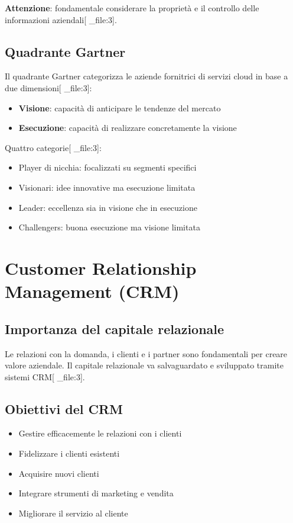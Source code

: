 \documentclass[12pt,a4paper]{article}
\begin{document}
\textbf{Attenzione}: fondamentale considerare la proprietà e il controllo delle informazioni aziendali[ _file:3].

\subsection{Quadrante Gartner}
Il quadrante Gartner categorizza le aziende fornitrici di servizi cloud in base a due dimensioni[ _file:3]:
\begin{itemize}
    \item \textbf{Visione}: capacità di anticipare le tendenze del mercato
    \item \textbf{Esecuzione}: capacità di realizzare concretamente la visione
\end{itemize}

Quattro categorie[ _file:3]:
\begin{itemize}
    \item Player di nicchia: focalizzati su segmenti specifici
    \item Visionari: idee innovative ma esecuzione limitata
    \item Leader: eccellenza sia in visione che in esecuzione
    \item Challengers: buona esecuzione ma visione limitata
\end{itemize}

\section{Customer Relationship Management (CRM)}

\subsection{Importanza del capitale relazionale}
Le relazioni con la domanda, i clienti e i partner sono fondamentali per creare valore aziendale. Il capitale relazionale va salvaguardato e sviluppato tramite sistemi CRM[ _file:3].

\subsection{Obiettivi del CRM}
\begin{itemize}
    \item Gestire efficacemente le relazioni con i clienti
    \item Fidelizzare i clienti esistenti
    \item Acquisire nuovi clienti
    \item Integrare strumenti di marketing e vendita
    \item Migliorare il servizio al cliente
\end{itemize}
\end{document}
